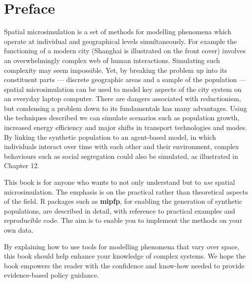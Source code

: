 \chapter*{Preface}

Spatial microsimulation is a set of methods for modelling phenomena which operate
at individual and geographical levels simultaneously.
For example the functioning of a modern city (Shanghai is illustrated on the front cover)
involves an overwhelmingly complex web of human interactions.
Simulating such complexity may seem impossible.
Yet, by breaking the problem up into its
constituent parts --- discrete geographic areas and a sample of the
population --- spatial microsimulation can be used to model key aspects of the city system on
an everyday laptop computer.
There are dangers associated with reductionism, but
condensing a problem down to its fundamentals has many advantages. 
Using the techniques described we can simulate scenarios such as population growth, increased energy efficiency and major shifts in transport technologies and modes.
By linking the synthetic population
to an agent-based model, in which individuals interact over time with each other and their environment, complex
behaviours such as social segregation could also be simulated, as illustrated in Chapter 12.

This book is for anyone who wants to not only understand
but to \emph{use} spatial microsimulation.
The emphasis is on the practical rather than theoretical aspects of the field.
R packages such as \textbf{mipfp}, for enabling the generation of synthetic populations, are described in
detail, with reference to practical examples and reproducible code.
The aim is to enable you to implement the methods on your own
data. 

By explaining how to use tools for modelling
phenomena that vary over space,
this book should help enhance your knowledge of
complex systems. We hope the book empowers the reader with the confidence and know-how
needed to provide evidence-based policy guidance.


